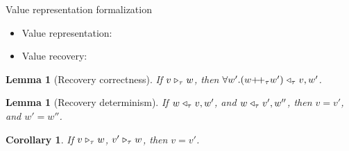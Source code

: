 \documentclass{beamer}
\newtheorem{lem}[thm]{Lemma}
\newtheorem{cor}[thm]{Corollary}
\begin{document}
\begin{frame}{Value representation formalization}
\begin{itemize}
	\item Value representation:
	\item Value recovery:
\end{itemize}

\begin{lem}[Recovery correctness]
	If $v \mathrel{\triangleright_{\tau}} w$, then $\forall w'.\Vtransb{(w {\++}_{\tau} w')}{\tau}{v}{w'}$. 
\end{lem}


\begin{lem}[Recovery determinism] 
	If $w \mathrel{\triangleleft_{\tau}} v,w'$, and $w \mathrel{\triangleleft_{\tau}} v',w''$,
	then $v = v'$, and $w' = w'' $.
\end{lem}


\begin{cor}
	If $v \mathrel{\triangleright_{\tau}} w$, $v' \mathrel{\triangleright_{\tau}} w$,
	then $v=v'$.
\end{cor}

\end{frame}
 
\end{document}
